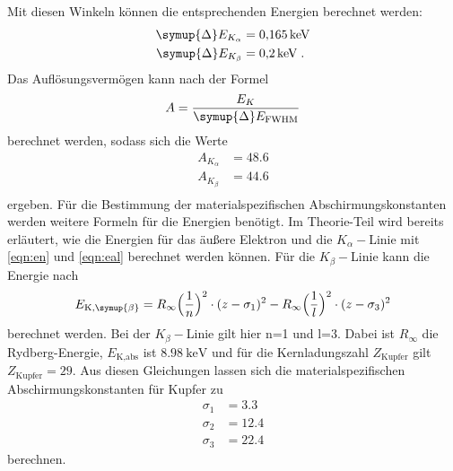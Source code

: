 Mit diesen Winkeln können die entsprechenden Energien berechnet werden:
\begin{align}
  \symup{\Delta}E_{K_\alpha} &= \SI{0.165}{\kilo\electronvolt} \\
  \symup{\Delta}E_{K_\beta}  &= \SI{0.2}{\kilo\electronvolt} \; .
\end{align}
\noindent 
Das Auflösungsvermögen kann nach der Formel
\begin{equation*}
    A = \frac{E_K}{\symup{\Delta}E_{\text{FWHM}}}
\end{equation*}
berechnet werden, sodass sich die Werte
\begin{align*}
    A_{K_\alpha} &= \num{48.6} \\
    A_{K_\beta}  &= \num{44.6} \\
\end{align*}
ergeben. \newline
Für die Bestimmung der materialspezifischen Abschirmungskonstanten werden weitere Formeln für die Energien benötigt.
Im Theorie-Teil wird bereits erläutert, wie die Energien für das äußere Elektron und die $K_\alpha-$Linie mit \autoref{eqn:en} und \autoref{eqn:eal} berechnet werden können. Für die $K_\beta-$Linie kann die Energie nach
\begin{equation}
\label{eqn:ebeta}
E_{\text{K},\symup{\beta}} = R_\infty \Bigl(\frac{1}{n}\Bigr)^2 \cdot (z - \sigma_1)^2 - R_\infty \Bigl(\frac{1}{l}\Bigr)^2 \cdot (z - \sigma_3)^2
\end{equation}
berechnet werden. Bei der $K_\beta-$Linie gilt hier n=1 und l=3. 
Dabei ist $R_\infty$ die Rydberg-Energie, $E_\text{K,abs}$ ist $\SI{8.98}{\kilo\electronvolt}$\cite{wissen} und für die Kernladungszahl $Z_\text{Kupfer}$ gilt $Z_\text{Kupfer} = 29$. Aus diesen Gleichungen lassen sich die materialspezifischen Abschirmungskonstanten für Kupfer zu 
\begin{align*}
  \sigma_1 &= 3.3 \\
  \sigma_2 &= 12.4\\
  \sigma_3 &= 22.4
\end{align*}
berechnen.

